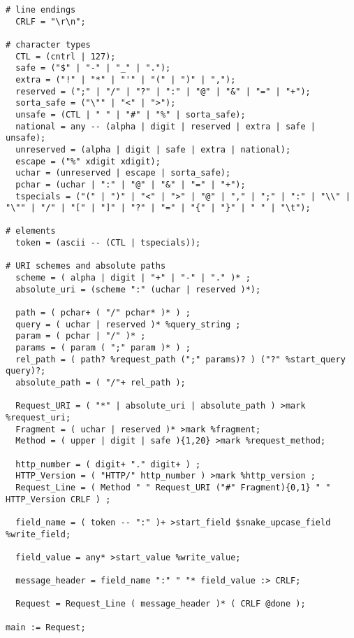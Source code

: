 \begin{lstlisting}
# line endings
  CRLF = "\r\n";
 
# character types
  CTL = (cntrl | 127);
  safe = ("$" | "-" | "_" | ".");
  extra = ("!" | "*" | "'" | "(" | ")" | ",");
  reserved = (";" | "/" | "?" | ":" | "@" | "&" | "=" | "+");
  sorta_safe = ("\"" | "<" | ">");
  unsafe = (CTL | " " | "#" | "%" | sorta_safe);
  national = any -- (alpha | digit | reserved | extra | safe | unsafe);
  unreserved = (alpha | digit | safe | extra | national);
  escape = ("%" xdigit xdigit);
  uchar = (unreserved | escape | sorta_safe);
  pchar = (uchar | ":" | "@" | "&" | "=" | "+");
  tspecials = ("(" | ")" | "<" | ">" | "@" | "," | ";" | ":" | "\\" | "\"" | "/" | "[" | "]" | "?" | "=" | "{" | "}" | " " | "\t");
 
# elements
  token = (ascii -- (CTL | tspecials));
 
# URI schemes and absolute paths
  scheme = ( alpha | digit | "+" | "-" | "." )* ;
  absolute_uri = (scheme ":" (uchar | reserved )*);
 
  path = ( pchar+ ( "/" pchar* )* ) ;
  query = ( uchar | reserved )* %query_string ;
  param = ( pchar | "/" )* ;
  params = ( param ( ";" param )* ) ;
  rel_path = ( path? %request_path (";" params)? ) ("?" %start_query query)?;
  absolute_path = ( "/"+ rel_path );
 
  Request_URI = ( "*" | absolute_uri | absolute_path ) >mark %request_uri;
  Fragment = ( uchar | reserved )* >mark %fragment;
  Method = ( upper | digit | safe ){1,20} >mark %request_method;
 
  http_number = ( digit+ "." digit+ ) ;
  HTTP_Version = ( "HTTP/" http_number ) >mark %http_version ;
  Request_Line = ( Method " " Request_URI ("#" Fragment){0,1} " " HTTP_Version CRLF ) ;
 
  field_name = ( token -- ":" )+ >start_field $snake_upcase_field %write_field;
 
  field_value = any* >start_value %write_value;
 
  message_header = field_name ":" " "* field_value :> CRLF;
 
  Request = Request_Line ( message_header )* ( CRLF @done );
 
main := Request;
\end{lstlisting}